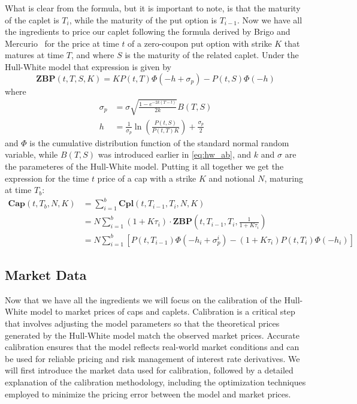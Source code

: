 \documentclass[titlepage, 12pt]{article}
\begin{document}
	What is clear from the formula, but it is important to note, is that the maturity of the caplet is $T_i$, while the maturity of the put option is $T_{i-1}$. Now we have all the ingredients to price our caplet following the formula derived by Brigo and Mercurio~\cite{brigo_mercurio2013} for the price at time $t$ of a zero-coupon put option with strike $K$ that matures at time $T$, and where $S$ is the maturity of the related caplet. Under the Hull-White model that expression is given by
	\begin{equation}
		\mathbf{ZBP}(t,T,S,K) = KP(t,T)\Phi(-h+\sigma_p) - P(t,S)\Phi(-h)
	\end{equation}
	where
	\begin{equation}
		\begin{split}
			\sigma_p &= \sigma\sqrt{\frac{1-e^{-2k(T-t)}}{2k}}B(T,S)\\
			h &= \frac{1}{\sigma_p}\ln\left(\frac{P(t,S)}{P(t,T)K}\right) + \frac{\sigma_p}{2}
		\end{split}
	\end{equation}
	and $\Phi$ is the cumulative distribution function of the standard normal random variable, while $B(T,S)$ was introduced earlier in \eqref{eq:hw_ab}, and $k$ and $\sigma$ are the parameteres of the Hull-White model. Putting it all together we get the expression for the time $t$ price of a cap with a strike $K$ and notional $N$, maturing at time $T_b$:
	\begin{equation}
		\begin{split}
			\mathbf{Cap}(t,T_b,N,K) &= \sum_{i=1}^b \mathbf{Cpl}(t,T_{i-1},T_i,N,K) \\
			&= N\sum_{i=1}^b (1+K\tau_i)\cdot\mathbf{ZBP}\left(t,T_{i-1},T_i,\frac{1}{1+K\tau_i}\right) \\
			&= N\sum_{i=1}^b \left[ P(t,T_{i-1})\Phi(-h_i+\sigma_p^i) - (1+K\tau_i)P(t,T_i)\Phi(-h_i) \right]
		\end{split}
	\end{equation}
	
	\subsection{Market Data}
	Now that we have all the ingredients we will focus on the calibration of the Hull-White model to market prices of caps and caplets. Calibration is a critical step that involves adjusting the model parameters so that the theoretical prices generated by the Hull-White model match the observed market prices. Accurate calibration ensures that the model reflects real-world market conditions and can be used for reliable pricing and risk management of interest rate derivatives. We will first introduce the market data used for calibration, followed by a detailed explanation of the calibration methodology, including the optimization techniques employed to minimize the pricing error between the model and market prices. 
	
\end{document}
